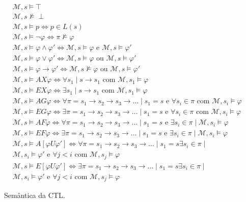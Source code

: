 \begin{figure}[ht]
	\centering
	\begin{align}
	&\mathcal{M},s  \models  \top \\
	&\mathcal{M},s  \not\models  \perp \\
	&\mathcal{M},s  \models  p \iff p \in L(s) \\
	&\mathcal{M},s  \models  \neg \varphi \iff \pi \not \models \varphi \\
	&\mathcal{M},s  \models  \varphi \wedge \varphi' \iff \mathcal{M},s \models \varphi \mbox{ e } \mathcal{M},s \models \varphi' \\
	&\mathcal{M},s  \models  \varphi \vee \varphi' \iff \mathcal{M},s \models \varphi \mbox{ ou } \mathcal{M},s \models \varphi' \\
	&\mathcal{M},s  \models  \varphi \to \varphi' \iff \mathcal{M},s \not\models \varphi \mbox{ ou } \mathcal{M},s \models \varphi' \\
	&\mathcal{M},s  \models  AX\varphi \iff \forall s_1 \mid s\to s_1 \mbox{ com } \mathcal{M}, s_1 \models \varphi \\
	&\mathcal{M},s  \models  EX\varphi \iff \exists s_1 \mid s\to s_1 \mbox{ com } \mathcal{M}, s_1 \models \varphi \\
	&\mathcal{M},s  \models  AG\varphi \iff \forall \pi = s_1\to s_2\to s_3\to \dots \mid s_1 = s \mbox{ e } \forall s_i \in \pi \mbox{ com } \mathcal{M}, s_i \models \varphi \\
	&\mathcal{M},s  \models  EG\varphi \iff \exists \pi = s_1\to s_2\to s_3\to \dots \mid s_1 = s \mbox{ e } \forall s_i \in \pi \mbox{ com } \mathcal{M}, s_i \models \varphi \\
	&\mathcal{M},s  \models  AF\varphi \iff \forall \pi = s_1\to s_2\to s_3\to \dots \mid s_1 = s \mbox{ e } \exists s_i \in \pi \mid \mathcal{M}, s_i \models \varphi \\
	&\mathcal{M},s  \models  EF\varphi \iff \exists \pi = s_1\to s_2\to s_3\to \dots \mid s_1 = s \mbox{ e } \exists s_i \in \pi \mid \mathcal{M}, s_i \models \varphi \\
	&\mathcal{M},s  \models  A[\varphi U \varphi'] \iff \forall \pi = s_1\to s_2\to s_3\to \dots \mid s_1 = s \exists s_i \in \pi \mid \\
	&\mathcal{M}, s_i \models \varphi' \mbox{ e } \forall j < i \mbox{ com }  \mathcal{M}, s_j \models \varphi \\
	&\mathcal{M},s  \models  E[\varphi U \varphi'] \iff \exists \pi = s_1\to s_2\to s_3\to \dots \mid s_1 = s \exists s_i \in \pi \mid \\
	&\mathcal{M}, s_i \models \varphi' \mbox{ e } \forall j < i \mbox{ com }  \mathcal{M}, s_j \models \varphi
	\end{align}
	\caption{Semântica da CTL.
		\label{fig:ctl_sem}}
\end{figure}
\FloatBarrier

